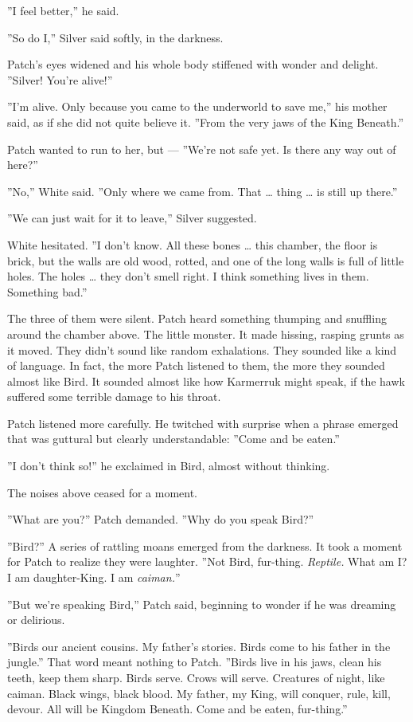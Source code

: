 \documentclass[12pt]{book}
\begin{document}
''I feel better,'' he said.

''So do I,'' Silver said softly, in the darkness.

Patch's eyes widened and his whole body stiffened with wonder and
delight. ''Silver! You're alive!''

''I'm alive. Only because you came to the underworld to save me,'' his
mother said, as if she did not quite believe it. ''From the very jaws
of the King Beneath.''

Patch wanted to run to her, but --- ''We're not safe yet. Is there any
way out of here?''

''No,'' White said. ''Only where we came from. That \ldots{} thing
\ldots{} is still up there.''

''We can just wait for it to leave,'' Silver suggested.

White hesitated. ''I don't know. All these bones \ldots{} this
chamber, the floor is brick, but the walls are old wood, rotted, and
one of the long walls is full of little holes. The holes \ldots{} they
don't smell right. I think something lives in them. Something bad.''

The three of them were silent. Patch heard something thumping and
snuffling around the chamber above. The little monster. It made
hissing, rasping grunts as it moved. They didn't sound like random
exhalations. They sounded like a kind of language. In fact, the more
Patch listened to them, the more they sounded almost like Bird. It
sounded almost like how Karmerruk might speak, if the hawk suffered
some terrible damage to his throat.

Patch listened more carefully. He twitched with surprise when a phrase
emerged that was guttural but clearly understandable: ''Come and be
eaten.''

''I don't think so!'' he exclaimed in Bird, almost without thinking.

The noises above ceased for a moment.

''What are you?'' Patch demanded. ''Why do you speak Bird?''

''Bird?'' A series of rattling moans emerged from the darkness. It
took a moment for Patch to realize they were laughter. ''Not Bird,
fur-thing. \textit{Reptile.} What am I? I am daughter-King. I am
\textit{caiman.}''

''But we're speaking Bird,'' Patch said, beginning to wonder if he was
dreaming or delirious.

''Birds our ancient cousins. My father's stories. Birds come to his
father in the jungle.'' That word meant nothing to Patch. ''Birds live
in his jaws, clean his teeth, keep them sharp. Birds serve. Crows will
serve. Creatures of night, like caiman. Black wings, black blood. My
father, my King, will conquer, rule, kill, devour. All will be Kingdom
Beneath. Come and be eaten, fur-thing.''
\end{document}
